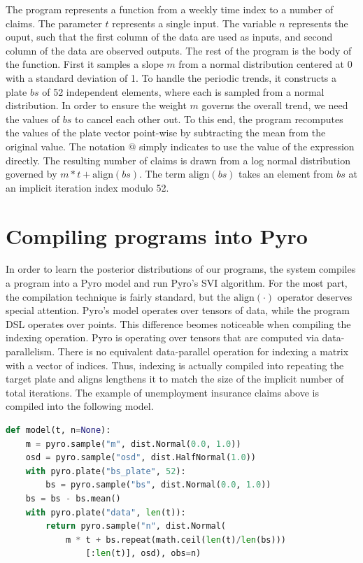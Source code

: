 \documentclass[letterpaper]{llncs}
\begin{document}
The program represents a function from a weekly time index to a number of claims.
The parameter $t$ represents a single input. The variable $n$ represents
the ouput, such that the first column of the data are used as inputs, 
and second column of the data are observed outputs.
The rest of the program is the body of the function.
First it samples a slope $m$ from a normal distribution centered at 0 with 
a standard deviation of 1. To handle the periodic trends, it constructs
a plate $bs$ of 52 independent elements, where each is sampled from 
a normal distribution. In order to ensure the weight $m$ governs
the overall trend, we need the values of $bs$ to cancel each other out.
To this end, the program recomputes the values of the plate vector point-wise 
by subtracting the mean from the original value. The notation $@$ simply indicates
to use the value of the expression directly.
The resulting number of claims is drawn from a log normal distribution
governed by $m * t + \text{align}(bs)$. The term $\text{align}(bs)$ takes an element from $bs$ 
at an implicit iteration index modulo 52. 



\section{Compiling programs into Pyro}
In order to learn the posterior distributions of our programs, the system compiles a program into  
a Pyro model and run Pyro's SVI algorithm. For the most part, the compilation technique
is fairly standard, but the $\text{align}(\cdot)$ operator deserves special attention. 
Pyro's model operates over tensors of data, while the program DSL operates over points. 
This difference beomes noticeable when compiling the indexing operation. Pyro is
operating over tensors that are computed via data-parallelism. There is no
equivalent data-parallel operation for indexing a matrix with a vector of indices.
Thus, indexing is actually compiled into repeating the target plate and aligns lengthens it
to match the size of the implicit number of total iterations.    
The example of unemployment insurance claims above is compiled into the following model.

\begin{lstlisting}[language=Python]
def model(t, n=None):
    m = pyro.sample("m", dist.Normal(0.0, 1.0))
    osd = pyro.sample("osd", dist.HalfNormal(1.0))
    with pyro.plate("bs_plate", 52):
        bs = pyro.sample("bs", dist.Normal(0.0, 1.0))
    bs = bs - bs.mean()
    with pyro.plate("data", len(t)):
        return pyro.sample("n", dist.Normal(
            m * t + bs.repeat(math.ceil(len(t)/len(bs)))
                [:len(t)], osd), obs=n)
\end{lstlisting}
\end{document}
